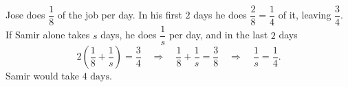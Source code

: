 Jose does $\dfrac18$ of the job per day. In his first $2$ days he does $\dfrac28=\dfrac14$ of it, leaving $\dfrac34$. If Samir alone takes $s$ days, he does $\dfrac1s$ per day, and in the last $2$ days
\[2\left(\dfrac18+\dfrac1s\right)=\dfrac34\quad\Longrightarrow\quad\dfrac18+\dfrac1s=\dfrac38\quad\Longrightarrow\quad\dfrac1s=\dfrac14.\]
Samir would take $\boxed{4\text{ days}}$.
